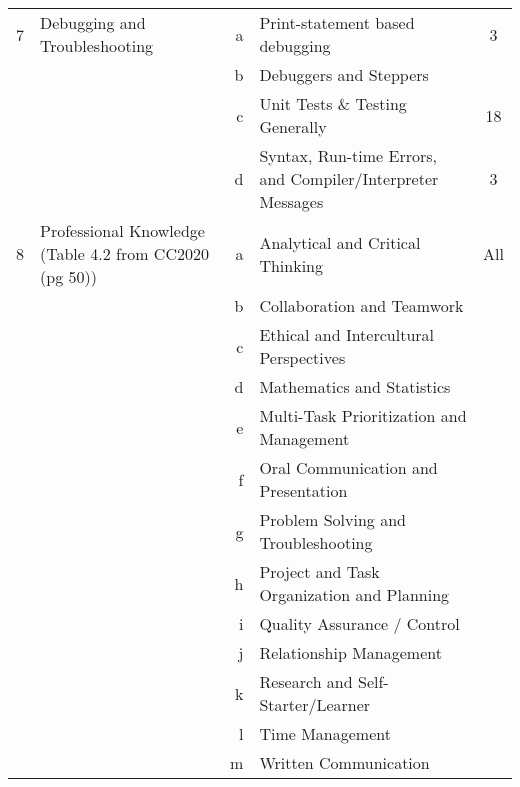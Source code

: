 \documentclass[10pt,letter]{article}
\begin{document}
{\begin{tabular}{r>{\raggedright}p{}r>{\raggedright}p{}c}
7 & Debugging and Troubleshooting & a & Print-statement based debugging & 3 \\
& & b & Debuggers and Steppers & \\
& & c & Unit Tests \& Testing Generally & 18 \\
& & d & Syntax, Run-time Errors, and Compiler/Interpreter Messages & 3 \\ \midrule
8 & Professional Knowledge (Table 4.2 from CC2020 (pg 50)) & a & Analytical and Critical Thinking & All \\
  & & b & Collaboration and Teamwork &  \\
  & & c & Ethical and Intercultural Perspectives &  \\
  & & d & Mathematics and Statistics &  \\
  & & e & Multi-Task Prioritization and Management &  \\
  & & f & Oral Communication and Presentation &  \\
  & & g & Problem Solving and Troubleshooting &  \\
  & & h & Project and Task Organization and Planning &  \\
  & & i & Quality Assurance / Control &  \\
  & & j & Relationship Management &  \\
  & & k & Research and Self-Starter/Learner & \\
  & & l & Time Management & \\
  & & m & Written Communication &  \\ \bottomrule
\end{tabular}
}%
\end{document}
